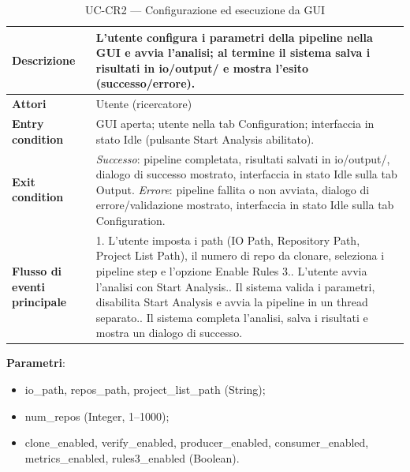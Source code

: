\documentclass[11pt,a4paper]{article}
\makeatletter
\newif\ifmark@prevlower
\def\mark@casebreak#1{%
  \ifcat\noexpand#1\relax
    \mark@prevlowerfalse
  \else
    \ifnum`#1=\uccode`#1\relax
      \ifmark@prevlower\allowbreak\fi
      \mark@prevlowerfalse
    \else
      \ifnum`#1=\lccode`#1\relax
        \mark@prevlowertrue
      \else
        \mark@prevlowerfalse
      \fi
    \fi
  \fi}
\def\mark@brk#1{%
  \ifx#1\mark@stop
    \let\mark@next\relax
  \else
    \mark@casebreak{#1}%
    #1%
    \ifx#1.\allowbreak\else
      \ifx#1\_\allowbreak\else
        \ifx#1/\allowbreak\else
          \ifx#1(\allowbreak\fi
        \fi
      \fi
    \fi
    \let\mark@next\mark@brk
  \fi
  \mark@next}
\def\mark@stop{\mark@stop}
\DeclareRobustCommand{\mark@code}[1]{%
  \ifmmode
    \text{\ttfamily\small\mark@prevlowerfalse\mark@brk#1\mark@stop}%
  \else
    {\ttfamily\small\mark@prevlowerfalse\mark@brk#1\mark@stop}%
  \fi}
\DeclareRobustCommand{\pkgpath}[1]{\mark@code{#1}}
\DeclareRobustCommand{\flag}[1]{\mark@code{#1}}
\def\mark@code#1{#1}%
\def\pkgpath#1{#1}%
\def\flag#1{#1}%
\newcommand{\thead}[1]{\textbf{#1}}
\makeatother
\begin{document}
\begin{table}[H]
  \centering\small
  \caption{UC-CR2 --- Configurazione ed esecuzione da GUI}
  \label{tab:uc-cr2}
  \begin{tabularx}{\linewidth}{@{}L{3.3cm} Y@{}}
    \toprule
    \thead{Descrizione} & L'utente configura i parametri della pipeline nella
      GUI e avvia l'analisi; al termine il sistema salva i risultati in
      \pkgpath{io/output/} e mostra l'esito (successo/errore).\\
    \midrule
    \thead{Attori} & Utente (ricercatore)\\
    \midrule
    \thead{Entry condition} & GUI aperta; utente nella tab Configuration;
      interfaccia in stato Idle (pulsante Start Analysis abilitato).\\
    \midrule
    \thead{Exit condition} &
      \emph{Successo}: pipeline completata, risultati salvati in
      \pkgpath{io/output/}, dialogo di successo mostrato, interfaccia in stato
      Idle sulla tab Output.\newline
      \emph{Errore}: pipeline fallita o non avviata, dialogo di
      errore/validazione mostrato, interfaccia in stato Idle sulla tab
      Configuration.\\
    \midrule
    \thead{Flusso di eventi principale} &
      1. L'utente imposta i path (IO Path, Repository Path, Project List Path),
         il numero di repo da clonare, seleziona i pipeline step e l'opzione
         Enable Rules 3.. L'utente avvia l'analisi con Start Analysis.. Il sistema valida i parametri, disabilita Start Analysis e avvia la
         pipeline in un thread separato.. Il sistema completa l'analisi, salva i risultati e mostra un dialogo
         di successo.\\
    \bottomrule
  \end{tabularx}
\end{table}

\textbf{Parametri}:

\begin{itemize}[nosep]
  \item \flag{io\_path}, \flag{repos\_path}, \flag{project\_list\_path}
    (String);
  \item \flag{num\_repos} (Integer, 1--1000);
  \item \flag{clone\_enabled}, \flag{verify\_enabled},
    \flag{producer\_enabled}, \flag{consumer\_enabled},
    \flag{metrics\_enabled}, \flag{rules3\_enabled} (Boolean).
\end{itemize}
\end{document}
